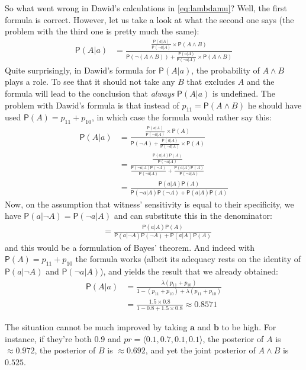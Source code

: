 \documentclass[10pt,dvipsnames,enabledeprecatedfontcommands]{scrartcl}
\newcommand{\ra}{\rangle}
\newcommand{\la}{\langle}
\newcommand{\n}{\neg}
\newcommand{\et}{\wedge}
\newcommand{\pr}[1]{\mathsf{P}(#1)}
\begin{document}
So what went wrong in Dawid's calculations in \eqref{eq:lambdamu}? Well,
the first formula is correct. However, let us take a look at what the
second one says (the problem with the third one is pretty much the
same): \begin{align*}
\pr{A\vert a } & = \frac{\frac{\pr{a\vert A}}{\pr{\n a \vert A}}\times \pr{A\et B}}{\pr{\n (A\et B)}+ \frac{\pr{a\vert A}}{\pr{\n a \vert A}} \times \pr{A\et B}}
\end{align*} Quite surprisingly, in Dawid's formula for
\(\pr{A\vert a}\), the probability of \(A\et B\) plays a role. To see
that it should not take any \(B\) that excludes \(A\) and the formula
will lead to the conclusion that \emph{always} \(\pr{A\vert a}\) is
undefined. The problem with Dawid's formula is that instead of
\(p_{11}=\pr{A\et B}\) he should have used \(\pr{A}=p_{11}+p_{10}\), in
which case the formula would rather say this: \begin{align*}
\pr{A\vert a } & = \frac{\frac{\pr{a\vert A}}{\pr{\n a \vert A}}\times \pr{A}}{\pr{\n A}+ \frac{\pr{a\vert A}}{\pr{\n a \vert A}} \times \pr{A}}\\
& = \frac{\frac{\pr{a\vert A}\pr{A}}{\pr{\n a \vert A}}}{\frac{\pr{\n a\vert A}\pr{\n A}}{\pr{\n a\vert A}}+ \frac{\pr{a\vert A}\pr{A}}{\pr{\n a \vert A}}}\\
& = \frac{\pr{a\vert A}\pr{A}}{\pr{\n a\vert A}\pr{\n A} + \pr{a\vert A}\pr{A}}
\end{align*} Now, on the assumption that witness' sensitivity is equal
to their specificity, we have \(\pr{a\vert \n A}=\pr{\n a \vert A}\) and
can substitute this in the denominator:
\begin{align*} & = \frac{\pr{a\vert A}\pr{A}}{\pr{ a\vert \n A}\pr{\n A} + \pr{a\vert A}\pr{A}}\end{align*}
and this would be a formulation of Bayes' theorem. And indeed with
\(\pr{A}=p_{11}+p_{10}\) the formula works (albeit its adequacy rests on
the identity of \(\pr{a\vert \n A}\) and \(\pr{\n a \vert A}\)), and
yields the result that we already obtained: \begin{align*}
\pr{A\vert a} &= \frac{\lambda(p_{11}+p_{10})}{1-(p_{11}+p_{10})+\lambda(p_{11}+p_{10})}\\
&= \frac{1.5\times 0.8}{1- 0.8+1.5\times 0.8} \approx 0.8571
\end{align*}

The situation cannot be much improved by taking \(\mathbf{a}\) and
\(\mathbf{b}\) to be high. For instance, if they're both 0.9 and
\(pr=\la0.1, 0.7, 0.1, 0.1 \ra\), the posterior of \(A\) is
\(\approx 0.972\), the posterior of \(B\) is \(\approx 0.692\), and yet
the joint posterior of \(A\et B\) is \(0.525\).
\end{document}
